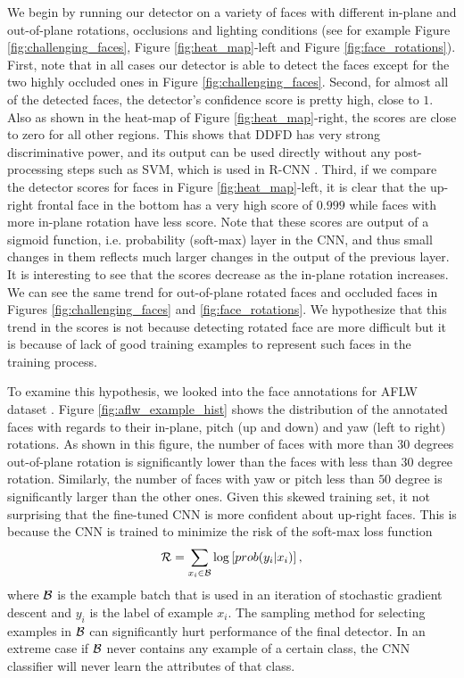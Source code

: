 \documentclass{sig-alternate-2013}
\begin{document}
We begin by running our detector on a variety of faces with different in-plane and out-of-plane rotations, occlusions and lighting conditions (see for example  Figure \ref{fig:challenging_faces}, Figure \ref{fig:heat_map}-left and Figure \ref{fig:face_rotations}). First, note that in all cases our detector is able to detect the faces except for the two highly occluded ones in Figure \ref{fig:challenging_faces}. Second, for almost all of the detected faces, the detector's confidence score is pretty high, close to $1$. Also as shown in the heat-map of Figure \ref{fig:heat_map}-right, the scores are close to zero for all other regions. This shows that DDFD has very strong discriminative power, and its output can be used directly without any post-processing steps such as SVM, which is used in R-CNN \cite{rcnn}. Third, if we compare the detector scores for faces in Figure \ref{fig:heat_map}-left, it is clear that the up-right frontal face in the bottom has a very high score of $0.999$ while faces with more in-plane rotation have less score. Note that these scores are output of a sigmoid function, i.e. probability (soft-max) layer in the CNN, and thus small changes in them reflects much larger changes in the output of the previous layer. It is interesting to see that the scores decrease as the in-plane rotation increases. We can see the same trend for out-of-plane rotated faces and occluded faces in Figures \ref{fig:challenging_faces} and \ref{fig:face_rotations}. We hypothesize that this trend in the scores is not because detecting rotated face are more difficult but it is because of lack of good training examples to represent such faces in the training process.

To examine this hypothesis, we looked into the face annotations for AFLW dataset \cite{AFLW}. Figure \ref{fig:aflw_example_hist} shows the distribution of the annotated faces with regards to their in-plane, pitch (up and down) and yaw (left to right) rotations. As shown in this figure, the number of faces with more than $30$ degrees out-of-plane rotation is significantly lower than the faces with less than $30$ degree rotation. Similarly, the number of faces with yaw or pitch less than $50$ degree is significantly larger than the other ones. Given this skewed training set, it not surprising that the fine-tuned CNN is more confident about up-right faces. This is because the CNN is trained to minimize the risk of the soft-max loss function
\begin{equation}{\cal R} = \sum_{x_i \in {\cal B}} \log\left[prob(y_i| x_i )\right],
\end{equation}
where ${\cal B}$ is the example batch that is used in an iteration of stochastic gradient descent and  $y_i$ is the label of example $x_i$. The sampling method for selecting examples in ${\cal B}$ can significantly hurt performance of the final detector. In an extreme case if ${\cal B}$ never contains any example of a certain class, the CNN classifier will never learn the attributes of that class.
\end{document}
